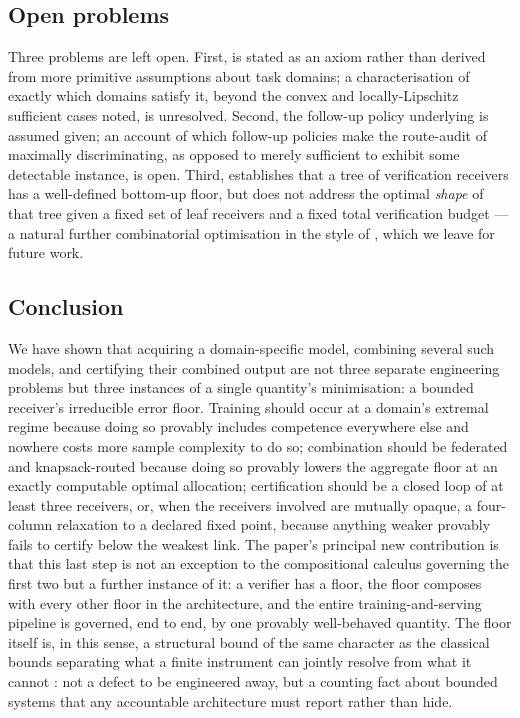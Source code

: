 \documentclass[11pt,twocolumn,a4paper]{article}
\theoremstyle{rdm}
\theoremstyle{definition}
\theoremstyle{remark}
\begin{document}
\subsection{Open problems}

Three problems are left open. First,  is stated as an
axiom rather than derived from more primitive assumptions about task
domains; a characterisation of exactly which domains satisfy it, beyond the
convex and locally-Lipschitz sufficient cases noted, is unresolved. Second,
the follow-up policy underlying  is assumed given; an
account of which follow-up policies make the route-audit of
 maximally discriminating, as opposed to merely
sufficient to exhibit some detectable instance, is open. Third,
 establishes that a tree of verification receivers has a
well-defined bottom-up floor, but does not address the optimal
\emph{shape} of that tree given a fixed set of leaf receivers and a fixed
total verification budget --- a natural further combinatorial optimisation
in the style of , which we leave for future work.

\subsection{Conclusion}

We have shown that acquiring a domain-specific model, combining several such
models, and certifying their combined output are not three separate
engineering problems but three instances of a single quantity's
minimisation: a bounded receiver's irreducible error floor. Training should
occur at a domain's extremal regime because doing so provably includes
competence everywhere else and nowhere costs more sample complexity to do
so; combination should be federated and knapsack-routed because doing so
provably lowers the aggregate floor at an exactly computable optimal
allocation; certification should be a closed loop of at least three
receivers, or, when the receivers involved are mutually opaque, a
four-column relaxation to a declared fixed point, because anything weaker
provably fails to certify below the weakest link. The paper's principal new
contribution is that this last step is not an exception to the compositional
calculus governing the first two but a further instance of it: a verifier
has a floor, the floor composes with every other floor in the architecture,
and the entire training-and-serving pipeline is governed, end to end, by one
provably well-behaved quantity. The floor itself is, in this sense, a
structural bound of the same character as the classical bounds separating
what a finite instrument can jointly resolve from what it cannot
\citep{robertson1929,shannon1948}: not a defect to be engineered away, but a
counting fact about bounded systems that any accountable architecture must
report rather than hide.




\end{document}
